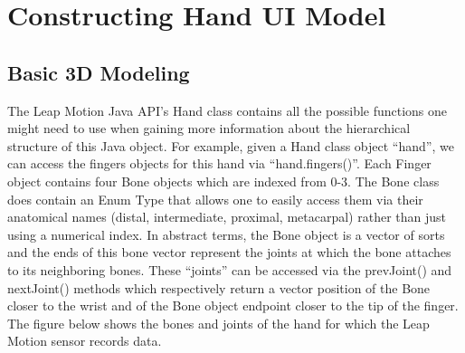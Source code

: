 \chapter{Constructing Hand UI Model}

\label{Chapter2} 

\section{Basic 3D Modeling}
The Leap Motion Java API’s Hand class contains all the possible functions one might need to use when gaining more information about the hierarchical structure of this Java object. For example, given a Hand class object “hand”, we can access the fingers objects for this hand via “hand.fingers()”.  Each Finger object contains four Bone objects which are indexed from 0-3. The Bone class does contain an Enum Type that allows one to easily access them via their anatomical names (distal, intermediate, proximal, metacarpal) rather than just using a numerical index. In abstract terms, the Bone object is a vector of sorts and the ends of this bone vector represent the joints at which the bone attaches to its neighboring bones. These “joints” can be accessed via the prevJoint() and nextJoint() methods which respectively return a vector position of the Bone closer to the wrist and of the Bone object endpoint closer to the tip of the finger. The figure below shows the bones and joints of the hand for which the Leap Motion sensor records data.  


